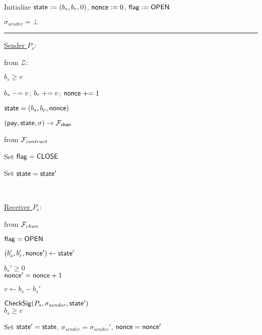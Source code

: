 \begin{bbox}[title={$\Pi_{\msf{pay}} (P_s, P_r, b_s, b_r)$}]

Initialize ${\mathsf {state}} := (b_s, b_r, 0)$, ${\mathsf {nonce}} := 0$, ${\mathsf {flag}} := {\mathsf {OPEN}}$

$\sigma_{sender} = \bot$

\vspace{2mm} \hrule \vspace{2mm}

\underline{Sender $P_s$}:

\OnInput {} from $\mathcal{Z}$:
	\begin{renumerate}
	\item \Require $b_s \geq v$
	\item $b_s \mathrel{-}= v$; $b_r \mathrel{+}= v$; ${\mathsf {nonce}} \mathrel{+}= 1$
	\item ${\mathsf {state}} = (b_s, b_r, {\mathsf {nonce}})$
	\end{renumerate} 
	 $({\mathsf {pay}}, {\mathsf {state}}, \sigma) \rightarrow \mathcal{F}_{{\mathsf {chan}}}$

\OnInput {} from $\mathcal{F}_{contract}$
	\begin{renumerate}
		\item Set ${\mathsf {flag}} = {\mathsf {CLOSE}}$
		\item Set ${\mathsf {state}} = {\mathsf {state}}'$
	\end{renumerate}

\

\underline{Receiver $P_r$}:

\OnInput {} from $\mathcal{F}_{chan}$
	\begin{renumerate}
		\item \Require ${\mathsf {flag}} = {\mathsf {OPEN}}$
		\item $(b_s', b_r', {\mathsf {nonce}}') \leftarrow {\mathsf {state}}'$
		\item \Require $b_s' \geq 0$ \\
			  \Require ${\mathsf {nonce'}} = {\mathsf {nonce}} + 1$

		\item $v \leftarrow b_s - b_s'$
		\item \Require ${\mathsf {CheckSig}}(P_s, \sigma_{sender}, {\mathsf {state}}')$ \\
			  \Require $b_s \geq v$

		\item Set ${\mathsf {state}}' = {\mathsf {state}}$, $\sigma_{sender} = \sigma_{sender}'$, ${\mathsf {nonce}} = {\mathsf {nonce}}'$
	\end{renumerate}


\end{bbox}
